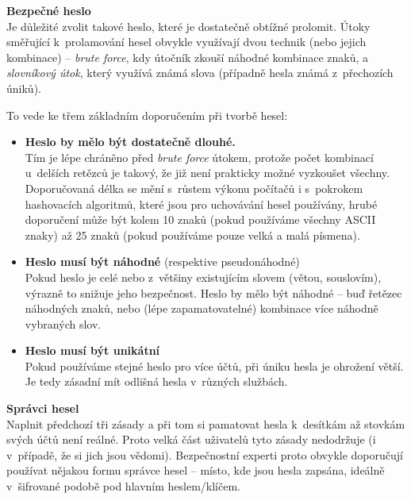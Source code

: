 
\textbf{Bezpečné heslo}\\
Je důležité zvolit takové heslo, které je dostatečně obtížné prolomit. Útoky směřující k~prolamování hesel obvykle využívají dvou technik (nebo jejich kombinace) -- \textit{brute force}, kdy útočník zkouší náhodné kombinace znaků, a \textit{slovníkový útok}, který využívá známá slova (případně hesla známá z~přechozích úniků).

To vede ke třem základním doporučením při tvorbě hesel:

\begin{itemize}
	\item \textbf{Heslo by mělo být dostatečně dlouhé.}\\
	Tím je lépe chráněno před \textit{brute force} útokem, protože počet kombinací u~delších retězců je takový, že již není prakticky možné vyzkoušet všechny. Doporučovaná délka se mění s~růstem výkonu počítačů i s~pokrokem hashovacích algoritmů, které jsou pro uchovávání hesel používány, hrubé doporučení může být kolem 10 znaků (pokud používáme všechny ASCII znaky) až 25 znaků (pokud používáme pouze velká a malá písmena).

	\item \textbf{Heslo musí být náhodné} (respektive pseudonáhodné)\\
	Pokud heslo je celé nebo z~většiny existujícím slovem (větou, souslovím), výrazně to snižuje jeho bezpečnost. Heslo by mělo být náhodné -- buď řetězec náhodných znaků, nebo (lépe zapamatovatelné) kombinace více náhodně vybraných slov.

	\item \textbf{Heslo musí být unikátní}\\
	Pokud používáme stejné heslo pro více účtů, při úniku hesla je ohrožení větší. Je tedy zásadní mít odlišná hesla v~různých službách. 

\end{itemize}

\textbf{Správci hesel}\\
Naplnit předchozí tři zásady a při tom si pamatovat hesla k~desítkám až stovkám svých účtů není reálné. Proto velká část uživatelů tyto zásady nedodržuje (i v~případě, že si jich jsou vědomi). Bezpečnostní experti proto obvykle doporučují používat nějakou formu správce hesel -- místo, kde jsou hesla zapsána, ideálně v~šifrované podobě pod hlavním heslem/klíčem.

